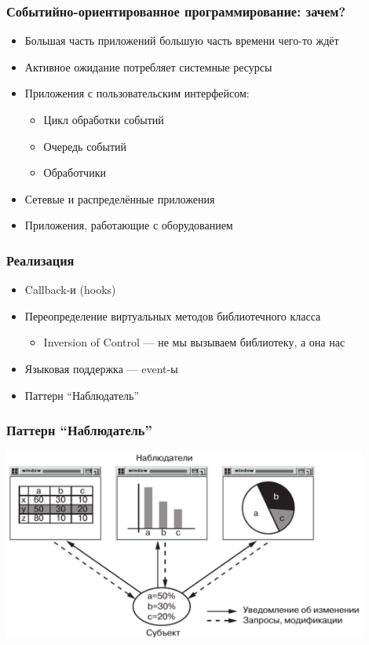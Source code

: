\documentclass{../../slides-style}
\begin{document}
    \begin{frame}[plain]
        \titlepage
    \end{frame}

    \begin{frame}
        \frametitle{Событийно-ориентированное программирование: зачем?}
        \begin{itemize}
            \item Большая часть приложений большую часть времени чего-то ждёт
            \item Активное ожидание потребляет системные ресурсы
            \item Приложения с пользовательским интерфейсом:
            \begin{itemize}
                \item Цикл обработки событий
                \item Очередь событий
                \item Обработчики
            \end{itemize}
            \item Сетевые и распределённые приложения
            \item Приложения, работающие с оборудованием
        \end{itemize}
    \end{frame}

    \begin{frame}
        \frametitle{Реализация}
        \begin{itemize}
            \item Callback-и (hooks)
            \item Переопределение виртуальных методов библиотечного класса
            \begin{itemize}
                \item Inversion of Control --- не мы вызываем библиотеку, а она нас
            \end{itemize}
            \item Языковая поддержка --- event-ы
            \item Паттерн ``Наблюдатель''
        \end{itemize}
    \end{frame}

    \begin{frame}
        \frametitle{Паттерн ``Наблюдатель''}
        \begin{center}
            \includegraphics[width=0.9\textwidth]{observerExample.png}
        \end{center}
    \end{frame}
\end{document}
